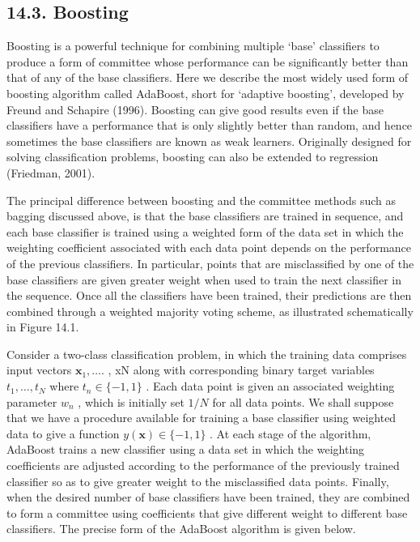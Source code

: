 \documentclass[
  10
]{article}
\begin{document}
\subsection{14.3. Boosting}\label{boosting}

Boosting is a powerful technique for combining multiple `base'
classifiers to produce a form of committee whose performance can be
significantly better than that of any of the base classifiers. Here we
describe the most widely used form of boosting algorithm called
AdaBoost, short for `adaptive boosting', developed by Freund and
Schapire (1996). Boosting can give good results even if the base
classifiers have a performance that is only slightly better than random,
and hence sometimes the base classifiers are known as weak learners.
Originally designed for solving classification problems, boosting can
also be extended to regression (Friedman, 2001).

The principal difference between boosting and the committee methods such
as bagging discussed above, is that the base classifiers are trained in
sequence, and each base classifier is trained using a weighted form of
the data set in which the weighting coefficient associated with each
data point depends on the performance of the previous classifiers. In
particular, points that are misclassified by one of the base classifiers
are given greater weight when used to train the next classifier in the
sequence. Once all the classifiers have been trained, their predictions
are then combined through a weighted majority voting scheme, as
illustrated schematically in Figure 14.1.

Consider a two-class classification problem, in which the training data
comprises input vectors \(\mathbf { x } _ { 1 } , \ldots .\) , xN along
with corresponding binary target variables
\(t _ { 1 } , \ldots , t _ { N }\) where \(t _ { n } \in \{ - 1 , 1 \}\)
. Each data point is given an associated weighting parameter
\(w _ { n }\) , which is initially set \(1 / N\) for all data points. We
shall suppose that we have a procedure available for training a base
classifier using weighted data to give a function
\(y ( \mathbf { x } ) \in \{ - 1 , 1 \}\) . At each stage of the
algorithm, AdaBoost trains a new classifier using a data set in which
the weighting coefficients are adjusted according to the performance of
the previously trained classifier so as to give greater weight to the
misclassified data points. Finally, when the desired number of base
classifiers have been trained, they are combined to form a committee
using coefficients that give different weight to different base
classifiers. The precise form of the AdaBoost algorithm is given below.
\end{document}
